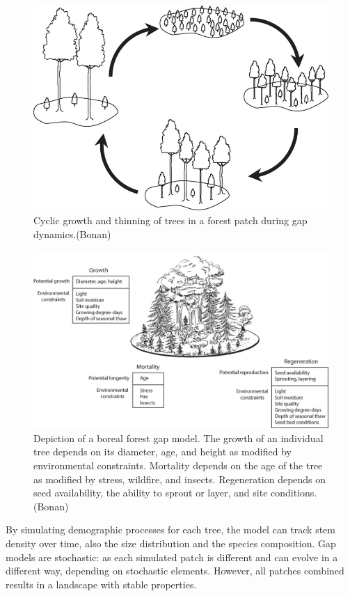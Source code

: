 \documentclass[12pt,oneside]{book}
\begin{document}
\begin{figure}

{\centering \includegraphics[width=0.8\linewidth]{figures/chap6/f69_gap_dynamics} 

}

\caption{Cyclic growth and thinning of trees in a forest patch during gap dynamics.(Bonan)}\label{fig:f69}
\end{figure}

\begin{figure}

{\centering \includegraphics[width=0.8\linewidth]{figures/chap6/f610_gap_model} 

}

\caption{Depiction of a boreal forest gap model. The growth of an individual tree depends on its diameter, age, and height as modified by environmental constraints. Mortality depends on the age of the tree as modified by stress, wildfire, and insects. Regeneration depends on seed availability, the ability to sprout or layer, and site conditions. (Bonan)}\label{fig:f610}
\end{figure}

By simulating demographic processes for each tree, the model can track
stem density over time, also the size distribution and the species
composition. Gap models are stochastic: as each simulated patch is
different and can evolve in a different way, depending on stochastic
elements. However, all patches combined results in a landscape with
stable properties.
\end{document}
